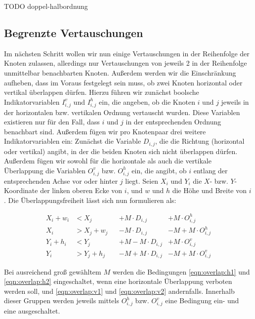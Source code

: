 TODO doppel-halbordnung

\subsection{Begrenzte Vertauschungen}
\label{sub:ilp:2}

Im nächsten Schritt wollen wir nun einige Vertauschungen in der Reihenfolge der Knoten zulassen, allerdings nur Vertauschungen von jeweils 2 in der Reihenfolge unmittelbar benachbarten Knoten. Außerdem werden wir die Einschränkung aufheben, dass im Voraus festgelegt sein muss, ob zwei Knoten horizontal oder vertikal überlappen dürfen. Hierzu führen wir zunächst boolsche Indikatorvariablen $I^{v}_{i,j}$ und $I^{h}_{i,j}$ ein, die angeben, ob die Knoten $i$ und $j$ jeweils in der horizontalen bzw. vertikalen Ordnung vertauscht wurden. Diese Variablen existieren nur für den Fall, dass $i$ und $j$ in der entsprechenden Ordnung benachbart sind. Außerdem fügen wir pro Knotenpaar drei weitere Indikatorvariablen ein: Zunächst die Variable $D_{i,j}$, die die Richtung (horizontal oder vertikal) angibt, in der die beiden Knoten sich nicht überlappen dürfen. Außerdem fügen wir sowohl für die horizontale als auch die vertikale Überlappung die Variablen $O^{v}_{i,j}$ bzw. $O^{h}_{i,j}$ ein, die angibt, ob $i$ entlang der entsprechenden Achse vor oder hinter $j$ liegt. Seien $X_i$ und $Y_i$ die $X$- bzw. $Y$-Koordinate der linken oberen Ecke von $i$, und $w$ und $h$ die Höhe und Breite von $i$. Die Überlappungsfreiheit lässt sich nun formulieren als:

\begin{align}
	X_i + w_i &< X_j &&+ M \cdot D_{i,j} &+ M \cdot O^{h}_{i,j} \label{eqn:overlap:h1}\\
	X_i &> X_j + w_j &&- M \cdot D_{i,j} &- M + M \cdot O^{h}_{i,j} \label{eqn:overlap:h2}\\
	Y_i + h_i &< Y_j &&+ M - M \cdot D_{i,j} &+ M \cdot O^{v}_{i,j} \label{eqn:overlap:v1}\\
	Y_i &> Y_j + h_j &&- M + M \cdot D_{i,j} &- M + M \cdot O^{v}_{i,j} \label{eqn:overlap:v2}
\end{align}

Bei ausreichend groß gewähltem $M$ werden die Bedingungen \ref{eqn:overlap:h1} und \ref{eqn:overlap:h2} eingeschaltet, wenn eine horizontale Überlappung verboten werden soll, und \ref{eqn:overlap:v1} und \ref{eqn:overlap:v2} andernfalls. Innerhalb dieser Gruppen werden jeweils mittels $O^{h}_{i,j}$ bzw. $O^{v}_{i,j}$ eine Bedingung ein- und eine ausgeschaltet.

